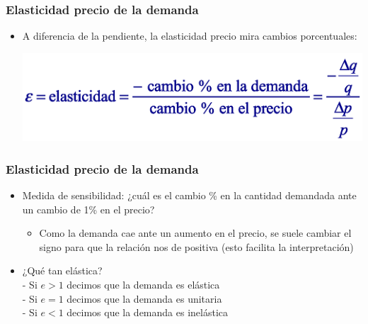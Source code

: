 \documentclass{beamer}
\begin{document}
\begin{frame}
\frametitle{Elasticidad precio de la demanda}
\begin{itemize}
    \item A diferencia de la pendiente, la elasticidad precio mira cambios porcentuales:
    \begin{center}
    \includegraphics[scale=0.7]{Slides Principios de Economia/Figures/Tema_06.43_elasticidadformula.png}
    \end{center}
    \end{itemize}
\end{frame}

\begin{frame}
\frametitle{Elasticidad precio de la demanda}
\begin{itemize}
    \item Medida de sensibilidad: ¿cuál es el cambio \% en la cantidad demandada ante un cambio de 1\% en el precio? \\\vspace{2mm}
    \begin{itemize}
        \item Como la demanda cae ante un aumento en el precio, se suele cambiar el signo para que la relación nos de positiva (esto facilita la interpretación)\vspace{4mm}
    \end{itemize}
    \item ¿Qué tan elástica? \\\vspace{2mm}
    - Si $e > 1$ decimos que la demanda es elástica \\
    - Si $e = 1$ decimos que la demanda es unitaria \\
    - Si $e < 1$ decimos que la demanda es inelástica
    \end{itemize}
\end{frame}
\end{document}
